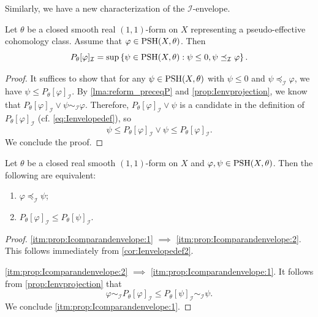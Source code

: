 Similarly, we have a new characterization of the $\mathcal{I}$-envelope.
\begin{corollary}\label{cor:Ienvelopedef2}
    Let $\theta$ be a closed smooth real $(1,1)$-form on $X$ representing a pseudo-effective cohomology class.
    Assume that $\varphi\in \mathrm{PSH}(X,\theta)$. Then
    \[
        P_{\theta}[\varphi]_{\mathcal{I}}=\sup\left\{ \psi\in \mathrm{PSH}(X,\theta): \psi\leq 0, \psi\preceq_{\mathcal{I}} \varphi \right\}.
    \]
\end{corollary}
\begin{proof}
    It suffices to show that for any $\psi\in \mathrm{PSH}(X,\theta)$ with $\psi\leq 0$ and $\psi\preceq_{\mathcal{I}}\varphi$, we have $\psi\leq P_{\theta}[\varphi]_{\mathcal{I}}$.
    By \cref{lma:reform_preceqP} and \cref{prop:Ienvprojection}, we know that $P_{\theta}[\varphi]_{\mathcal{I}}\lor \psi\sim_{\mathcal{I}}\varphi$. Therefore, $P_{\theta}[\varphi]_{\mathcal{I}}\lor \psi$ is a candidate in the definition of $P_{\theta}[\varphi]_{\mathcal{I}}$ (cf. \eqref{eq:Ienvelopedef}), so
    \[
    \psi\leq P_{\theta}[\varphi]_{\mathcal{I}}\lor \psi\leq P_{\theta}[\varphi]_{\mathcal{I}}.
    \]
    We conclude the proof.
\end{proof}

\begin{proposition}\label{prop:Icomparandenvelope}
    Let $\theta$ be a closed real smooth $(1,1)$-form on $X$ and $\varphi,\psi\in \mathrm{PSH}(X,\theta)$. Then the following are equivalent:
    \begin{enumerate}
        \item\label{itm:prop:Icomparandenvelope:1} $\varphi\preceq_{\mathcal{I}}\psi$;
        \item\label{itm:prop:Icomparandenvelope:2} $P_{\theta}[\varphi]_{\mathcal{I}}\leq P_{\theta}[\psi]_{\mathcal{I}}$.
    \end{enumerate}
\end{proposition}
\begin{proof}
    \ref{itm:prop:Icomparandenvelope:1} $\implies$ \ref{itm:prop:Icomparandenvelope:2}. This follows immediately from \cref{cor:Ienvelopedef2}.

    \ref{itm:prop:Icomparandenvelope:2} $\implies$ \ref{itm:prop:Icomparandenvelope:1}. It follows from \cref{prop:Ienvprojection} that
    \[
        \varphi\sim_{\mathcal{I}} P_{\theta}[\varphi]_{\mathcal{I}}\leq P_{\theta}[\psi]_{\mathcal{I}} \sim_{\mathcal{I}} \psi.
    \]
    We conclude \ref{itm:prop:Icomparandenvelope:1}.
\end{proof}

